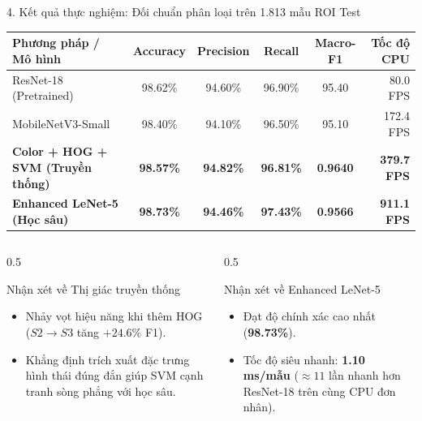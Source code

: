 \documentclass[aspectratio=169, 10pt]{beamer}
\begin{document}
\begin{frame}{4. Kết quả thực nghiệm: Đối chuẩn phân loại trên 1.813 mẫu ROI Test}
  \begin{table}[H]
    \centering
    \small
    \begin{tabularx}{\linewidth}{|l|c|c|c|c|r|}
      \hline
      \textbf{Phương pháp / Mô hình} & \textbf{Accuracy} & \textbf{Precision} & \textbf{Recall} & \textbf{Macro-F1} & \textbf{Tốc độ CPU} \\
      \hline
      ResNet-18 (Pretrained) & 98.62\% & 94.60\% & 96.90\% & 95.40 & 80.0 FPS \\
      MobileNetV3-Small & 98.40\% & 94.10\% & 96.50\% & 95.10 & 172.4 FPS \\
      \hline
      \textbf{Color + HOG + SVM (Truyền thống)} & \textbf{98.57\%} & \textbf{94.82\%} & \textbf{96.81\%} & \textbf{0.9640} & \textbf{379.7 FPS} \\
      \textbf{Enhanced LeNet-5 (Học sâu)} & \textbf{98.73\%} & \textbf{94.46\%} & \textbf{97.43\%} & \textbf{0.9566} & \textbf{911.1 FPS} \\
      \hline
    \end{tabularx}
  \end{table}

  \begin{columns}[T]
    \begin{column}{0.5\textwidth}
      \begin{block}{Nhận xét về Thị giác truyền thống}
        \begin{itemize}
          \item Nhảy vọt hiệu năng khi thêm HOG ($S2 \rightarrow S3$ tăng $+24.6\%$ F1).
          \item Khẳng định trích xuất đặc trưng hình thái đúng đắn giúp SVM cạnh tranh sòng phẳng với học sâu.
        \end{itemize}
      \end{block}
    \end{column}
    \begin{column}{0.5\textwidth}
      \begin{exampleblock}{Nhận xét về Enhanced LeNet-5}
        \begin{itemize}
          \item Đạt độ chính xác cao nhất (\textbf{98.73\%}).
          \item Tốc độ siêu nhanh: \textbf{1.10 ms/mẫu} ($\approx 11$ lần nhanh hơn ResNet-18 trên cùng CPU đơn nhân).
        \end{itemize}
      \end{exampleblock}
    \end{column}
  \end{columns}
\end{frame}
\end{document}
